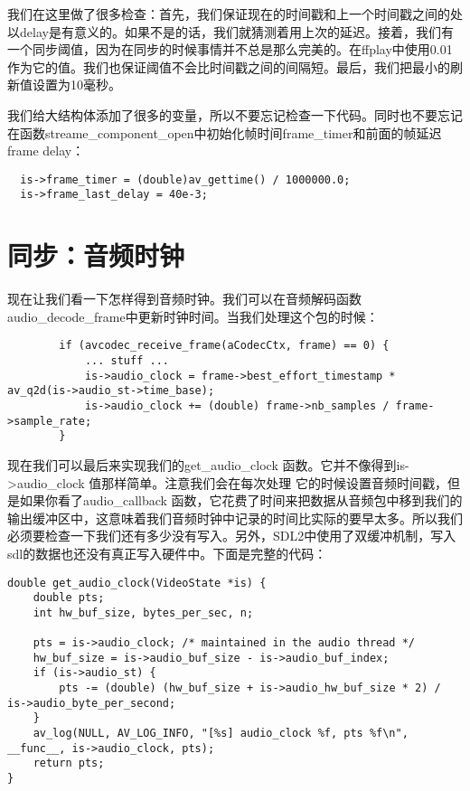 我们在这里做了很多检查：首先，我们保证现在的时间戳和上一个时间戳之间的处以delay是有意义的。如果不是的话，我们就猜测着用上次的延迟。接着，我们有一个同步阈值，因为在同步的时候事情并不总是那么完美的。在ffplay中使用0.01 作为它的值。我们也保证阈值不会比时间戳之间的间隔短。最后，我们把最小的刷新值设置为10毫秒。


我们给大结构体添加了很多的变量，所以不要忘记检查一下代码。同时也不要忘记在函数streame_component_open中初始化帧时间frame_timer和前面的帧延迟frame delay：

\begin{lstlisting}
  is->frame_timer = (double)av_gettime() / 1000000.0;
  is->frame_last_delay = 40e-3;
\end{lstlisting}

\section{同步：音频时钟}

现在让我们看一下怎样得到音频时钟。我们可以在音频解码函数audio_decode_frame中更新时钟时间。当我们处理这个包的时候：
\begin{lstlisting}
        if (avcodec_receive_frame(aCodecCtx, frame) == 0) {
            ... stuff ...
            is->audio_clock = frame->best_effort_timestamp * av_q2d(is->audio_st->time_base);
            is->audio_clock += (double) frame->nb_samples / frame->sample_rate;
        }
\end{lstlisting}

现在我们可以最后来实现我们的get_audio_clock 函数。它并不像得到is->audio_clock 值那样简单。注意我们会在每次处理 它的时候设置音频时间戳，但是如果你看了audio_callback 函数，它花费了时间来把数据从音频包中移到我们的输出缓冲区中，这意味着我们音频时钟中记录的时间比实际的要早太多。所以我们必须要检查一下我们还有多少没有写入。另外，SDL2中使用了双缓冲机制，写入sdl的数据也还没有真正写入硬件中。下面是完整的代码：

\begin{lstlisting}
double get_audio_clock(VideoState *is) {
    double pts;
    int hw_buf_size, bytes_per_sec, n;

    pts = is->audio_clock; /* maintained in the audio thread */
    hw_buf_size = is->audio_buf_size - is->audio_buf_index;
    if (is->audio_st) {
        pts -= (double) (hw_buf_size + is->audio_hw_buf_size * 2) / is->audio_byte_per_second;
    }
    av_log(NULL, AV_LOG_INFO, "[%s] audio_clock %f, pts %f\n", __func__, is->audio_clock, pts);
    return pts;
}
\end{lstlisting}

